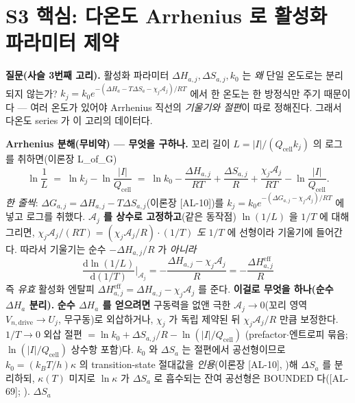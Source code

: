 \documentclass[11pt,a4paper]{article}
\newcommand{\dd}{\mathrm{d}}
\newcommand{\eff}{\mathrm{eff}}
\newcommand{\drive}{\mathrm{drive}}
\newcommand{\cell}{\mathrm{cell}}
\newcommand{\AL}[1]{\textsf{[AL-#1]}}
\begin{document}
\section{S3 핵심: 다온도 Arrhenius 로 활성화 파라미터 제약}\label{sec:ch6_arrhenius}
\textbf{질문(사슬 3번째 고리).} 활성화 파라미터 $\Delta H_{a,j},\Delta S_{a,j},k_0$ 는 \emph{왜} 단일 온도로는
분리되지 않는가? $k_j=k_0 e^{-(\Delta H_a-T\Delta S_a-\chi_j\mathcal A_j)/RT}$ 에서 한 온도는 한 방정식만 주기
때문이다 — 여러 온도가 있어야 Arrhenius 직선의 \emph{기울기와 절편}이 따로 정해진다. 그래서 다온도 series 가 이
고리의 데이터다.

\textbf{Arrhenius 분해(무비약) — 무엇을 구하나.} 꼬리 길이 $L=|I|/(Q_\cell k_j)$ 의 로그를 취하면(이론장 L\_of\_G)
\begin{equation}
\ln\frac1L\;=\;\ln k_j-\ln\frac{|I|}{Q_\cell}\;=\;\ln k_0-\frac{\Delta H_{a,j}}{RT}+\frac{\Delta S_{a,j}}{R}
+\frac{\chi_j\mathcal A_j}{RT}-\ln\frac{|I|}{Q_\cell}.
\label{eq:ch6_arrhenius}
\end{equation}
\emph{한 줄씩}: $\Delta G_{a,j}=\Delta H_{a,j}-T\Delta S_{a,j}$(이론장 \AL{10})를 $k_j=k_0 e^{-(\Delta G_{a,j}-\chi_j
\mathcal A_j)/RT}$ 에 넣고 로그를 취했다. \textbf{$\mathcal A_j$ 를 상수로 고정하고}(같은 동작점) $\ln(1/L)$ 을 $1/T$ 에
대해 그리면, $\chi_j\mathcal A_j/(RT)=(\chi_j\mathcal A_j/R)\cdot(1/T)$ \emph{도} $1/T$ 에 선형이라 기울기에 들어간다.
따라서 기울기는 순수 $-\Delta H_{a,j}/R$ 가 \emph{아니라}
\begin{equation}
\frac{\dd\ln(1/L)}{\dd(1/T)}\Big|_{\mathcal A_j}=-\frac{\Delta H_{a,j}-\chi_j\mathcal A_j}{R}=-\frac{\Delta H_{a,j}^{\eff}}{R}
\label{eq:ch6_arrhenius_slope}
\end{equation}
즉 \emph{유효} 활성화 엔탈피 $\Delta H_{a,j}^{\eff}=\Delta H_{a,j}-\chi_j\mathcal A_j$ 를 준다.
\textbf{이걸로 무엇을 하나(순수 $\Delta H_a$ 분리).} \textbf{순수 $\Delta H_a$ 를 얻으려면} 구동력을 없앤 극한
$\mathcal A_j\to0$(꼬리 영역 $V_{n,\drive}\to U_j$, 무구동)로 외삽하거나, $\chi_j$ 가 독립 제약된 뒤 $\chi_j\mathcal A_j/R$
만큼 보정한다. $1/T\to0$ 외삽 절편 $=\ln k_0+\Delta S_{a,j}/R-\ln(|I|/Q_\cell)$ (prefactor$\cdot$엔트로피 묶음;
$\ln(|I|/Q_\cell)$ 상수항 포함)다. $k_0$ 와 $\Delta S_a$ 는 절편에서 공선형이므로 $k_0=(k_BT/h)\kappa$ 의
transition-state 절대값을 \emph{인용}(이론장 \AL{10}, \cite{eyring1935})해 $\Delta S_a$ 를 분리하되, $\kappa(T)$
미지로 $\ln\kappa$ 가 $\Delta S_a$ 로 흡수되는 잔여 공선형은 BOUNDED 다(\AL{69}; \cite{bardfaulkner}). $\Delta S_a$
\end{document}
